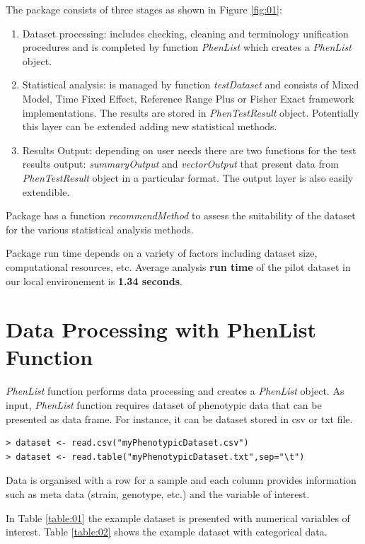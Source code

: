 \documentclass[12pt,a4paper]{article}
\begin{document}
The package consists of three stages as shown in Figure \ref{fig:01}:
\begin{enumerate}
\item Dataset processing: includes checking, cleaning and terminology unification procedures and is completed by function \textit{PhenList} which creates a \textit{PhenList} object. 
\item Statistical analysis: is managed by function \textit{testDataset} and consists of Mixed Model, Time Fixed Effect, Reference Range Plus or Fisher Exact framework implementations. The results are stored in \textit{PhenTestResult} object. 
Potentially this layer can be extended adding new statistical methods. 
\item Results Output: depending on user needs there are two functions for the test results output: \textit{summaryOutput} 
and \textit{vectorOutput} that present data from \textit{PhenTestResult} object in a particular format. The output layer is also easily extendible.
\end{enumerate}

Package has a function \textit{recommendMethod} to assess the suitability of the dataset for the various statistical analysis methods.
 
Package run time depends on a variety of factors including dataset size, computational resources, etc. Average analysis \textbf{run time} of the pilot dataset in our local environement is \textbf{1.34 seconds}. 


\section{Data Processing with PhenList Function}
\textit{PhenList} function performs data processing and creates a \textit{PhenList} object. 
As input, \textit{PhenList} function requires dataset of phenotypic data that can be presented as data frame. For instance, it can be dataset stored in csv or txt file. 


\begingroup
    \fontsize{8pt}{12pt}\selectfont
\begin{verbatim}
> dataset <- read.csv("myPhenotypicDataset.csv")
> dataset <- read.table("myPhenotypicDataset.txt",sep="\t")
\end{verbatim}
\endgroup
Data is organised with a row for a sample and each column provides information such as meta data (strain, genotype, etc.) and the variable of interest.

In Table \ref{table:01} the example dataset is presented with numerical variables of interest. Table \ref{table:02} shows the example dataset with categorical data. 
\end{document}
